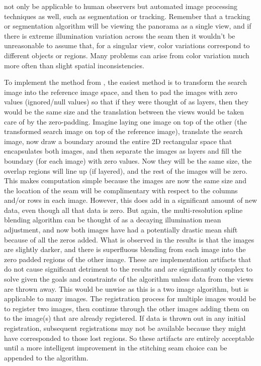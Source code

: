 not only be applicable to human observers but automated image processing techniques as well, such as segmentation or tracking. Remember that a tracking or segmentation algorithm will be viewing the panorama as a single view, and if there is extreme illumination variation across the seam then it wouldn't be unreasonable to assume that, for a singular view, color variations correspond to different objects or regions. Many problems can arise from color variation much more often than slight spatial inconsistencies.

To implement the method from \cite{Burt1983}, the easiest method is to transform the search image into the reference image space, and then to pad the images with zero values (ignored/null values) so that if they were thought of as layers, then they would be the same size and the translation between the views would be taken care of by the zero-padding. Imagine laying one image on top of the other (the transformed search image on top of the reference image), translate the search image, now draw a boundary around the entire 2D rectangular space that encapsulates both images, and then separate the images as layers and fill the boundary (for each image) with zero values. Now they will be the same size, the overlap regions will line up (if layered), and the rest of the images will be zero. This makes computation simple because the images are now the same size and the location of the seam will be complimentary with respect to the columns and/or rows in each image. However, this does add in a significant amount of new data, even though all that data is zero. But again, the multi-resolution spline blending algorithm can be thought of as a decaying illumination mean adjustment, and now both images have had a potentially drastic mean shift because of all the zeros added. What is observed in the results is that the images are slightly darker, and there is superfluous blending from each image into the zero padded regions of the other image. These are implementation artifacts that do not cause significant detriment to the results and are significantly complex to solve given the goals and constraints of the algorithm unless data from the views are thrown away. This would be unwise as this is a two image algorithm, but is applicable to many images. The registration process for multiple images would be to register two images, then continue through the other images adding them on to the image(s) that are already registered. If data is thrown out in any initial registration, subsequent registrations may not be available because they might have corresponded to those lost regions. So these artifacts are entirely acceptable until a more intelligent improvement in the stitching seam choice can be appended to the algorithm.

